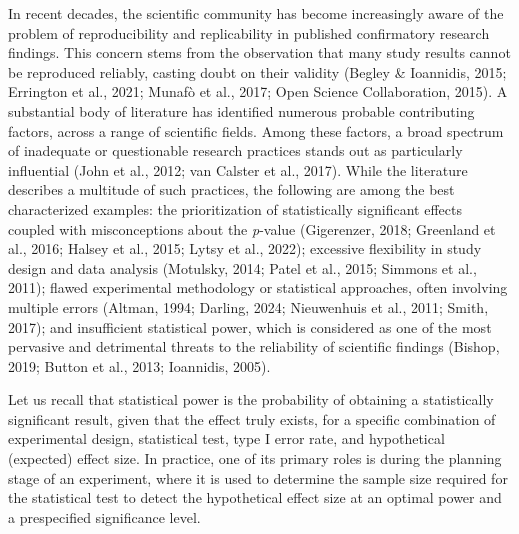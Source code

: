 \documentclass[authordate, meta, issue]{jote-new-article}
\begin{document}
	In recent decades, the scientific community has become increasingly aware of the problem of reproducibility and replicability in published confirmatory research findings. This concern stems from the observation that many study results cannot be reproduced reliably, casting doubt on their validity (Begley \& Ioannidis, 2015; Errington et al., 2021; Munafò et al., 2017; Open Science Collaboration, 2015). A substantial body of literature has identified numerous probable contributing factors, across a range of scientific fields. Among these factors, a broad spectrum of inadequate or questionable research practices stands out as particularly influential (John et al., 2012; van Calster et al., 2017). While the literature describes a multitude of such practices, the following are among the best characterized examples: the prioritization of statistically significant effects coupled with misconceptions about the \emph{p}-value (Gigerenzer, 2018; Greenland et al., 2016; Halsey et al., 2015; Lytsy et al., 2022); excessive flexibility in study design and data analysis (Motulsky, 2014; Patel et al., 2015; Simmons et al., 2011); flawed experimental methodology or statistical approaches, often involving multiple errors (Altman, 1994; Darling, 2024; Nieuwenhuis et al., 2011; Smith, 2017); and insufficient statistical power, which is considered as one of the most pervasive and detrimental threats to the reliability of scientific findings (Bishop, 2019; Button et al., 2013; Ioannidis, 2005).



	Let us recall that statistical power is the probability of obtaining a statistically significant result, given that the effect truly exists, for a specific combination of experimental design, statistical test, type I error rate, and hypothetical (expected) effect size. In practice, one of its primary roles is during the planning stage of an experiment, where it is used to determine the sample size required for the statistical test to detect the hypothetical effect size at an optimal power and a prespecified significance level.
\end{document}
